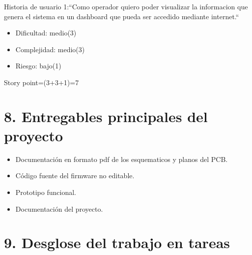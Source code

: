 \documentclass[
11pt, %
codirector, %
]{charter}
\begin{document}
Historia de usuario 1:``Como operador quiero poder visualizar la informacion que genera el sistema en un dashboard
que pueda ser accedido mediante internet.``
\begin{itemize}
	\item Dificultad: medio(3) 
	\item Complejidad: medio(3)
	\item Riesgo: bajo(1)  
\end{itemize}
Story point=(3+3+1)=7

\section{8. Entregables principales del proyecto}
\label{sec:entregables}

\begin{itemize}
	\item Documentación en formato pdf de los esquematicos y planos del PCB.
	\item Código fuente del firmware no editable.
	\item Prototipo funcional.
	\item Documentación del proyecto.
\end{itemize}

\section{9. Desglose del trabajo en tareas}
\label{sec:wbs}
\end{document}
